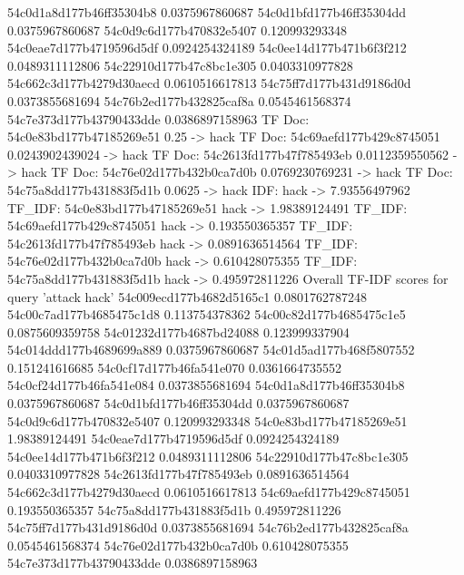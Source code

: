 \documentclass[12pt]{article}
\begin{document}
\begin{spverbatim}
54c0d1a8d177b46ff35304b8 0.0375967860687
54c0d1bfd177b46ff35304dd 0.0375967860687
54c0d9c6d177b470832e5407 0.120993293348
54c0eae7d177b4719596d5df 0.0924254324189
54c0ee14d177b471b6f3f212 0.0489311112806
54c22910d177b47c8bc1e305 0.0403310977828
54c662c3d177b4279d30aecd 0.0610516617813
54c75ff7d177b431d9186d0d 0.0373855681694
54c76b2ed177b432825caf8a 0.0545461568374
54c7e373d177b43790433dde 0.0386897158963
TF Doc: 54c0e83bd177b47185269e51 0.25 -> hack
TF Doc: 54c69aefd177b429c8745051 0.0243902439024 -> hack
TF Doc: 54c2613fd177b47f785493eb 0.0112359550562 -> hack
TF Doc: 54c76e02d177b432b0ca7d0b 0.0769230769231 -> hack
TF Doc: 54c75a8dd177b431883f5d1b 0.0625 -> hack
IDF:  hack -> 7.93556497962
TF_IDF:  54c0e83bd177b47185269e51 hack -> 1.98389124491
TF_IDF:  54c69aefd177b429c8745051 hack -> 0.193550365357
TF_IDF:  54c2613fd177b47f785493eb hack -> 0.0891636514564
TF_IDF:  54c76e02d177b432b0ca7d0b hack -> 0.610428075355
TF_IDF:  54c75a8dd177b431883f5d1b hack -> 0.495972811226
Overall TF-IDF scores for query 'attack hack'
54c009ecd177b4682d5165c1 0.0801762787248
54c00c7ad177b4685475c1d8 0.113754378362
54c00c82d177b4685475c1e5 0.0875609359758
54c01232d177b4687bd24088 0.123999337904
54c014ddd177b4689699a889 0.0375967860687
54c01d5ad177b468f5807552 0.151241616685
54c0cf17d177b46fa541e070 0.0361664735552
54c0cf24d177b46fa541e084 0.0373855681694
54c0d1a8d177b46ff35304b8 0.0375967860687
54c0d1bfd177b46ff35304dd 0.0375967860687
54c0d9c6d177b470832e5407 0.120993293348
54c0e83bd177b47185269e51 1.98389124491
54c0eae7d177b4719596d5df 0.0924254324189
54c0ee14d177b471b6f3f212 0.0489311112806
54c22910d177b47c8bc1e305 0.0403310977828
54c2613fd177b47f785493eb 0.0891636514564
54c662c3d177b4279d30aecd 0.0610516617813
54c69aefd177b429c8745051 0.193550365357
54c75a8dd177b431883f5d1b 0.495972811226
54c75ff7d177b431d9186d0d 0.0373855681694
54c76b2ed177b432825caf8a 0.0545461568374
54c76e02d177b432b0ca7d0b 0.610428075355
54c7e373d177b43790433dde 0.0386897158963

\end{spverbatim}
\end{document}

